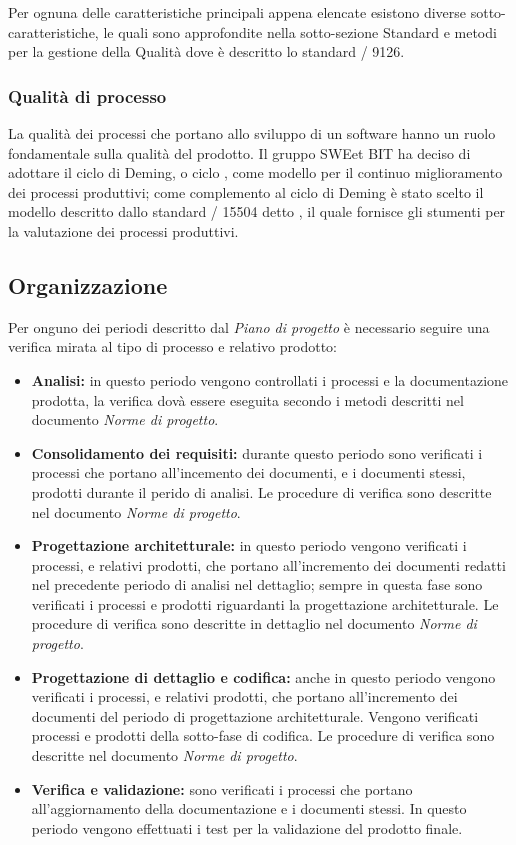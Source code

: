     Per ognuna delle caratteristiche principali appena elencate esistono diverse sotto-caratteristiche,
    le quali sono approfondite nella sotto-sezione Standard e metodi per la gestione della Qualità dove è descritto lo standard / 9126.

    \subsubsection{Qualità di processo}
    La qualità dei processi che portano allo sviluppo di un software hanno un ruolo fondamentale sulla qualità del prodotto.
    Il gruppo SWEet BIT ha deciso di adottare il ciclo di Deming, o ciclo , come modello per il continuo miglioramento dei processi produttivi;
    come complemento al ciclo di Deming è stato scelto il modello descritto dallo standard / 15504 detto ,
    il quale fornisce gli stumenti per la valutazione dei processi produttivi.

  \subsection{Organizzazione}
    Per onguno dei periodi descritto dal \emph{Piano di progetto} è necessario seguire una verifica mirata al tipo di processo e relativo prodotto:
    \begin{itemize}
      \item \textbf{Analisi:} in questo periodo vengono controllati i processi e la documentazione prodotta,
      la verifica dovà essere eseguita secondo i metodi descritti nel documento \emph{Norme di progetto}.
      \item \textbf{Consolidamento dei requisiti:} durante questo periodo sono verificati i processi che portano all'incemento dei documenti, e i documenti stessi, prodotti durante il perido di analisi.
      Le procedure di verifica sono descritte nel documento \emph{Norme di progetto}.
      \item \textbf{Progettazione architetturale:} in questo periodo vengono verificati i processi, e relativi prodotti, che portano all'incremento dei documenti redatti nel precedente periodo di analisi nel dettaglio;
      sempre in questa fase sono verificati i processi e prodotti riguardanti la progettazione architetturale.
      Le procedure di verifica sono descritte in dettaglio nel documento \emph{Norme di progetto}.
      \item \textbf{Progettazione di dettaglio e codifica:} anche in questo periodo vengono verificati i processi, e relativi prodotti, che portano all'incremento dei documenti del periodo di progettazione architetturale.
      Vengono verificati processi e prodotti della sotto-fase di codifica. Le procedure di verifica sono descritte nel documento \emph{Norme di progetto}.
      \item \textbf{Verifica e validazione:} sono verificati i processi che portano all'aggiornamento della documentazione e i documenti stessi.
      In questo periodo vengono effettuati i test per la validazione del prodotto finale.
    \end{itemize}

